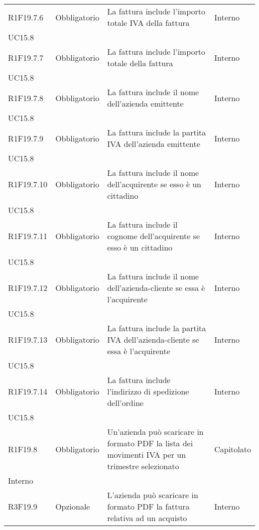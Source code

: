 \begin{longtable}{ >{\centering}p{} >{\centering}p{}
			>{\raggedright}p{} >{\centering}p{}}
R1F19.7.6	&	Obbligatorio	&	La fattura include l'importo totale IVA della fattura	&	Interno\\ UC15.8	\tabularnewline
R1F19.7.7	&	Obbligatorio	&	La fattura include l'importo totale della fattura	&	Interno\\ UC15.8	\tabularnewline
R1F19.7.8	&	Obbligatorio	&	La fattura include il nome dell'azienda emittente	&	Interno\\ UC15.8	\tabularnewline
R1F19.7.9	&	Obbligatorio	&	La fattura include la partita IVA dell'azienda emittente	&	Interno\\ UC15.8	\tabularnewline
R1F19.7.10	&	Obbligatorio	&	La fattura include il nome dell'acquirente se esso è un cittadino	&	Interno\\ UC15.8	\tabularnewline
R1F19.7.11	&	Obbligatorio	&	La fattura include il cognome dell'acquirente se esso è un cittadino	&	Interno\\ UC15.8	\tabularnewline
R1F19.7.12	&	Obbligatorio	&	La fattura include il nome dell'azienda-cliente se essa è l'acquirente	&	Interno\\ UC15.8	\tabularnewline
R1F19.7.13	&	Obbligatorio	&	La fattura include la partita IVA dell'azienda-cliente se essa è l'acquirente	&	Interno\\ UC15.8	\tabularnewline
R1F19.7.14	&	Obbligatorio	&	La fattura include l'indirizzo di spedizione dell'ordine	&	Interno\\ UC15.8	\tabularnewline
R1F19.8	&	Obbligatorio	&	Un'azienda può scaricare in formato PDF la lista dei movimenti IVA per un trimestre selezionato	&	Capitolato\\ Interno	\tabularnewline
R3F19.9	&	Opzionale	&	L'azienda può scaricare in formato PDF la fattura relativa ad un acquisto	&	Interno	\tabularnewline
		
		
		
		
	\end{longtable}

